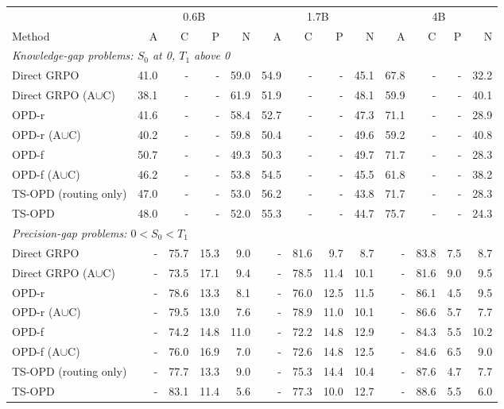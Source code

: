 \begin{tabular}{lrrrrrrrrrrrr}
\toprule
 & \multicolumn{4}{c}{0.6B} & \multicolumn{4}{c}{1.7B} & \multicolumn{4}{c}{4B} \\
\cmidrule(lr){2-5}\cmidrule(lr){6-9}\cmidrule(lr){10-13}
Method & A & C & P & N & A & C & P & N & A & C & P & N \\
\midrule
\multicolumn{13}{l}{\textit{Knowledge-gap problems: $S_0$ at 0, $T_1$ above 0}} \\
Direct GRPO & 41.0 & - & - & 59.0 & 54.9 & - & - & 45.1 & 67.8 & - & - & 32.2 \\
Direct GRPO (A$\cup$C) & 38.1 & - & - & 61.9 & 51.9 & - & - & 48.1 & 59.9 & - & - & 40.1 \\
OPD-r & 41.6 & - & - & 58.4 & 52.7 & - & - & 47.3 & 71.1 & - & - & 28.9 \\
OPD-r (A$\cup$C) & 40.2 & - & - & 59.8 & 50.4 & - & - & 49.6 & 59.2 & - & - & 40.8 \\
OPD-f & 50.7 & - & - & 49.3 & 50.3 & - & - & 49.7 & 71.7 & - & - & 28.3 \\
OPD-f (A$\cup$C) & 46.2 & - & - & 53.8 & 54.5 & - & - & 45.5 & 61.8 & - & - & 38.2 \\
TS-OPD (routing only) & 47.0 & - & - & 53.0 & 56.2 & - & - & 43.8 & 71.7 & - & - & 28.3 \\
TS-OPD & 48.0 & - & - & 52.0 & 55.3 & - & - & 44.7 & 75.7 & - & - & 24.3 \\
\midrule
\multicolumn{13}{l}{\textit{Precision-gap problems: $0<S_0<T_1$}} \\
Direct GRPO & - & 75.7 & 15.3 & 9.0 & - & 81.6 & 9.7 & 8.7 & - & 83.8 & 7.5 & 8.7 \\
Direct GRPO (A$\cup$C) & - & 73.5 & 17.1 & 9.4 & - & 78.5 & 11.4 & 10.1 & - & 81.6 & 9.0 & 9.5 \\
OPD-r & - & 78.6 & 13.3 & 8.1 & - & 76.0 & 12.5 & 11.5 & - & 86.1 & 4.5 & 9.5 \\
OPD-r (A$\cup$C) & - & 79.5 & 13.0 & 7.6 & - & 78.9 & 11.0 & 10.1 & - & 86.6 & 5.7 & 7.7 \\
OPD-f & - & 74.2 & 14.8 & 11.0 & - & 72.2 & 14.8 & 12.9 & - & 84.3 & 5.5 & 10.2 \\
OPD-f (A$\cup$C) & - & 76.0 & 16.9 & 7.0 & - & 72.6 & 14.8 & 12.5 & - & 84.6 & 6.5 & 9.0 \\
TS-OPD (routing only) & - & 77.7 & 13.3 & 9.0 & - & 75.3 & 14.4 & 10.4 & - & 87.6 & 4.7 & 7.7 \\
TS-OPD & - & 83.1 & 11.4 & 5.6 & - & 77.3 & 10.0 & 12.7 & - & 88.6 & 5.5 & 6.0 \\
\bottomrule
\end{tabular}

